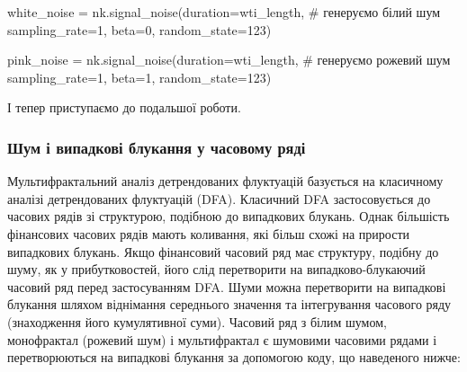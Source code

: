 \documentclass[
  letterpaper,
]{report}
\newenvironment{Shaded}{\begin{snugshade}}{\end{snugshade}}
\newcommand{\CommentTok}[1]{\textcolor[rgb]{0.37,0.37,0.37}{#1}}
\newcommand{\DecValTok}[1]{\textcolor[rgb]{0.68,0.00,0.00}{#1}}
\newcommand{\NormalTok}[1]{\textcolor[rgb]{0.00,0.23,0.31}{#1}}
\newcommand{\OperatorTok}[1]{\textcolor[rgb]{0.37,0.37,0.37}{#1}}
\begin{document}
\begin{Shaded}
\begin{Highlighting}[]
\NormalTok{white\_noise }\OperatorTok{=}\NormalTok{ nk.signal\_noise(duration}\OperatorTok{=}\NormalTok{wti\_length, }\CommentTok{\# генеруємо білий шум }
\NormalTok{                              sampling\_rate}\OperatorTok{=}\DecValTok{1}\NormalTok{, }
\NormalTok{                              beta}\OperatorTok{=}\DecValTok{0}\NormalTok{, }
\NormalTok{                              random\_state}\OperatorTok{=}\DecValTok{123}\NormalTok{)}

\NormalTok{pink\_noise }\OperatorTok{=}\NormalTok{ nk.signal\_noise(duration}\OperatorTok{=}\NormalTok{wti\_length,  }\CommentTok{\# генеруємо рожевий шум }
\NormalTok{                              sampling\_rate}\OperatorTok{=}\DecValTok{1}\NormalTok{, }
\NormalTok{                              beta}\OperatorTok{=}\DecValTok{1}\NormalTok{, }
\NormalTok{                              random\_state}\OperatorTok{=}\DecValTok{123}\NormalTok{)}
\end{Highlighting}
\end{Shaded}

І тепер приступаємо до подальшої роботи.

\hypertarget{ux448ux443ux43c-ux456-ux432ux438ux43fux430ux434ux43aux43eux432ux456-ux431ux43bux443ux43aux430ux43dux43dux44f-ux443-ux447ux430ux441ux43eux432ux43eux43cux443-ux440ux44fux434ux456}{%
\subsubsection{Шум і випадкові блукання у часовому
ряді}\label{ux448ux443ux43c-ux456-ux432ux438ux43fux430ux434ux43aux43eux432ux456-ux431ux43bux443ux43aux430ux43dux43dux44f-ux443-ux447ux430ux441ux43eux432ux43eux43cux443-ux440ux44fux434ux456}}

Мультифрактальний аналіз детрендованих флуктуацій базується на
класичному аналізі детрендованих флуктуацій (DFA). Класичний DFA
застосовується до часових рядів зі структурою, подібною до випадкових
блукань. Однак більшість фінансових часових рядів мають коливання, які
більш схожі на прирости випадкових блукань. Якщо фінансовий часовий ряд
має структуру, подібну до шуму, як у прибутковостей, його слід
перетворити на випадково-блукаючий часовий ряд перед застосуванням DFA.
Шуми можна перетворити на випадкові блукання шляхом віднімання
середнього значення та інтегрування часового ряду (знаходження його
кумулятивної суми). Часовий ряд з білим шумом, монофрактал (рожевий шум)
і мультифрактал є шумовими часовими рядами і перетворюються на випадкові
блукання за допомогою коду, що наведеного нижче:
\end{document}
